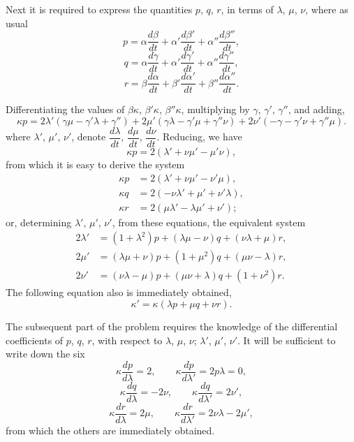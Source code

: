 \documentclass[11pt]{article}
\begin{document}
Next it is required to express the quantities $p$, $q$, $r$, in terms of $\lambda$, $\mu$, $\nu$, where as usual
\[
p = \alpha \frac{d\beta}{dt} + \alpha' \frac{d\beta'}{dt} + \alpha'' \frac{d\beta''}{dt},
\]
\[
q = \alpha \frac{d\gamma}{dt} + \alpha' \frac{d\gamma'}{dt} + \alpha'' \frac{d\gamma''}{dt},
\]
\[
r = \beta \frac{d\alpha}{dt} + \beta' \frac{d\alpha'}{dt} + \beta'' \frac{d\alpha''}{dt}.
\]

Differentiating the values of $\beta\kappa$, $\beta'\kappa$, $\beta''\kappa$, multiplying by $\gamma$, $\gamma'$, $\gamma''$, and adding,
\[
\kappa p = 2\lambda'(\gamma\mu - \gamma'\lambda + \gamma'') + 2\mu'(\gamma\lambda - \gamma'\mu + \gamma''\nu) + 2\nu'(-\gamma - \gamma'\nu + \gamma''\mu).
\]
where $\lambda'$, $\mu'$, $\nu'$, denote $\dfrac{d\lambda}{dt}$, $\dfrac{d\mu}{dt}$, $\dfrac{d\nu}{dt}$. Reducing, we have
\[
\kappa p = 2(\lambda' + \nu\mu' - \mu'\nu),
\]
from which it is easy to derive the system
\[
\begin{aligned}
\kappa p &= 2(\lambda' + \nu\mu' - \nu'\mu), \\
\kappa q &= 2(-\nu\lambda' + \mu' + \nu'\lambda), \\
\kappa r &= 2(\mu\lambda' - \lambda\mu' + \nu');
\end{aligned}
\]
or, determining $\lambda'$, $\mu'$, $\nu'$, from these equations, the equivalent system
\[
\begin{aligned}
2\lambda' &= (1 + \lambda^2) p + (\lambda\mu - \nu) q + (\nu\lambda + \mu) r, \\
2\mu'     &= (\lambda\mu + \nu) p + (1 + \mu^2) q + (\mu\nu - \lambda) r, \\
2\nu'     &= (\nu\lambda - \mu) p + (\mu\nu + \lambda) q + (1 + \nu^2) r.
\end{aligned}
\]
The following equation also is immediately obtained,
\[
\kappa' = \kappa(\lambda p + \mu q + \nu r).
\]

The subsequent part of the problem requires the knowledge of the differential coefficients of $p$, $q$, $r$, with respect to $\lambda$, $\mu$, $\nu$; $\lambda'$, $\mu'$, $\nu'$. It will be sufficient to write down the six
\[
\kappa \frac{dp}{d\lambda} = 2, \qquad \kappa \frac{dp}{d\lambda'} = 2 p\lambda = 0,
\]
\[
\kappa \frac{dq}{d\lambda} = -2\nu, \qquad \kappa \frac{dq}{d\lambda'} = 2\nu',
\]
\[
\kappa \frac{dr}{d\lambda} = 2\mu, \qquad \kappa \frac{dr}{d\lambda'} = 2\nu\lambda - 2\mu',
\]
from which the others are immediately obtained.
\end{document}
